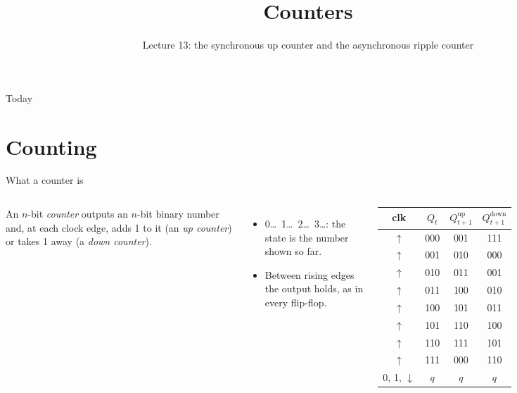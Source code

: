 \documentclass[10pt]{wosm-slides}
\title[Lecture 13 \textperiodcentered\ Counters]{Counters}
\subtitle{Lecture 13: the synchronous up counter and the asynchronous ripple counter}
\begin{document}
\maketitle

\begin{frame}{Today}
  \tableofcontents
\end{frame}

\section{Counting}

\begin{frame}{What a counter is}
  \begin{columns}[T, totalwidth=\textwidth]
      \begin{definition}[Counter]
        An $n$-bit \emph{counter} outputs an $n$-bit binary number and, at each
        clock edge, adds 1 to it (an \emph{up counter}) or takes 1 away (a
        \emph{down counter}).
      \end{definition}
      \begin{itemize}
        \item 0\ldots\ 1\ldots\ 2\ldots\ 3\ldots: the state is the number
          shown so far.
        \item Between rising edges the output holds, as in every flip-flop.
      \end{itemize}
      \centering
      \small
      \begin{tabular}{@{}c|c|cc@{}}
        clk & $Q_t$ & $Q^{\mathrm{up}}_{t+1}$ & $Q^{\mathrm{down}}_{t+1}$ \\
        \midrule
        $\uparrow$ & 000 & 001 & 111 \\
        $\uparrow$ & 001 & 010 & 000 \\
        $\uparrow$ & 010 & 011 & 001 \\
        $\uparrow$ & 011 & 100 & 010 \\
        $\uparrow$ & 100 & 101 & 011 \\
        $\uparrow$ & 101 & 110 & 100 \\
        $\uparrow$ & 110 & 111 & 101 \\
        $\uparrow$ & 111 & 000 & 110 \\
        \midrule
        0, 1, $\downarrow$ & $q$ & $q$ & $q$ \\
      \end{tabular}\par\smallskip
  \end{columns}
\end{frame}
\end{document}
